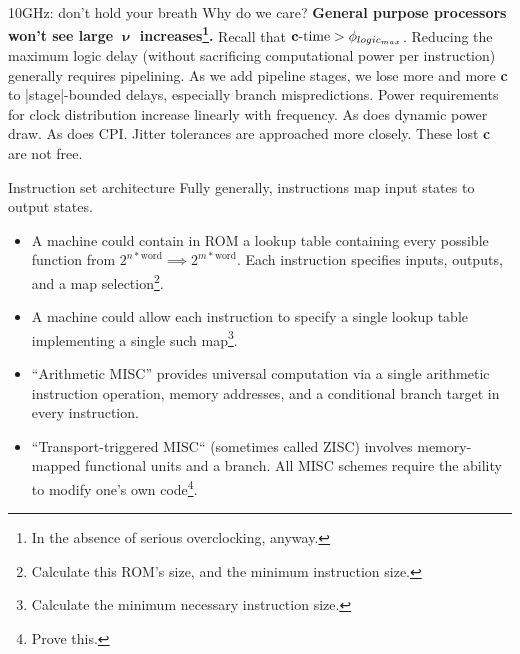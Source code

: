 \documentclass[mathserif,xcolor={dvipsnames,table}]{beamer}
\begin{document}
\begin{frame}{10GHz: don't hold your breath}
Why do we care?
\vfill
\textbf{General purpose processors won't see large $\boldsymbol \upnu$ increases\footnote{In the absence of serious overclocking, anyway.}.}
\vfill
Recall that $\text{\textbf{c}-time} > \phi_{logic_{max}}$. Reducing the maximum logic
delay (without sacrificing computational power per instruction) generally
requires pipelining. As we add pipeline stages, we lose more and more
\textbf{c} to |stage|-bounded delays, especially branch mispredictions.
\vfill
Power requirements for clock distribution increase linearly with frequency.
As does dynamic power draw. As does CPI. Jitter tolerances are approached
more closely. These lost \textbf{c} are not free.
\end{frame}

\begin{frame}{Instruction set architecture}
Fully generally, instructions map input states to output states.
\small{
\begin{itemize}
\item A machine could contain in ROM a lookup table containing every possible
function from $2^{n*\text{word}}\implies 2^{m*\text{word}}$. Each instruction
specifies inputs, outputs, and a map selection\footnote{Calculate this ROM's size, and the minimum instruction size.}.
\item A machine could allow each instruction to specify a single lookup table implementing
a single such map\footnote{Calculate the minimum necessary instruction size.}.
\item ``Arithmetic MISC'' provides universal computation via a single arithmetic instruction
operation, memory addresses, and a conditional branch target in every instruction.
\item``Transport-triggered MISC`` (sometimes called ZISC) involves memory-mapped
functional units and a branch. All MISC schemes require the ability to modify one's
own code\footnote{Prove this.}.
\end{itemize}
}
\end{frame}
\end{document}
